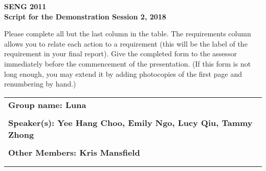 \documentclass[a4paper,10pt]{article}
\begin{document}
\vspace*{-20mm}
\begin{center} 
\Large\bf SENG 2011\\
\vspace{3mm}
\large\bf Script for the Demonstration Session 2, 2018 \\ 
\vspace{2mm}
\end{center} 

\noindent
Please complete all but the last column in the table.
The requirements column allows you to relate each action to a requirement (this will be the
label of the requirement in your final report).
Give the completed form to the assessor immediately before the commencement of the presentation.
(If this form is not long enough, you may extend it by adding photocopies of the first page 
and renumbering by hand.)

\vspace{3mm}
\hspace*{-8mm}
\begin{tabular}{l}
\bf Group name: Luna\\
\\
\bf Speaker(s): Yee Hang Choo, Emily Ngo, Lucy Qiu, Tammy Zhong\\
\\
\bf Other Members: Kris Mansfield
\\
\\
\\
\end{tabular}
\end{document}
